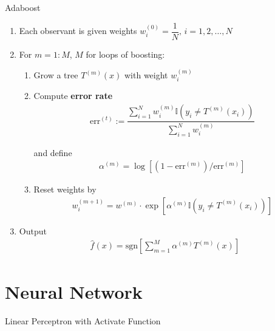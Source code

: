 \begin{algorithm}{Adaboost}
    \begin{enumerate}[topsep=2pt,itemsep=2pt]
        \item Each observant is given weights $ w_i^{(0)}=\dfrac{1}{N},\,i=1,2,\ldots,N $
        \item For $ m=1:M $, $ M $ for loops of boosting:
        \begin{enumerate}[topsep=2pt,itemsep=2pt]
            \item Grow a tree $ T^{(m)}(x) $ with weight $ w_i^{(m)} $
            \item Compute \textbf{error rate}
            \begin{align}
                \mathrm{err}^{(t)} :=\dfrac{\sum_{i=1}^Nw_i^{(m)}\mathbb{I}(y_i\neq T^{(m)}(x_i))}{\sum_{i=1}^Nw_i^{(m)}}
            \end{align}

            and define 
            \begin{align}
                 \alpha ^{(m)}=\log\left[(1-\mathrm{err}^{(m)} )\big/\mathrm{err}^{(m)}\right]
            \end{align}
            \item Reset weights by
            \begin{align}
                w_i ^{(m+1)}=w^{(m)}\cdot\exp\left[ \alpha ^{(m)}\mathbb{I}(y_i\neq T^{(m)}(x_i)) \right]
            \end{align}
         
        \end{enumerate}
        \item Output
        \begin{align}
            \hat{f}(x)=\mathrm{sgn}\left[\sum_{m=1}^M\alpha ^{(m)}T^{(m)}(x)\right]  
        \end{align}
        
        
            
    \end{enumerate}
    
        
\end{algorithm}
    

\section{Neural Network}\label{SubSectionNeuralNetwork}
\begin{point}
    Linear Perceptron with Activate Function
\end{point}


